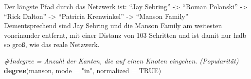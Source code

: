 \documentclass[
]{article}
\newenvironment{Shaded}{\begin{snugshade}}{\end{snugshade}}
\newcommand{\CommentTok}[1]{\textcolor[rgb]{0.56,0.35,0.01}{\textit{#1}}}
\newcommand{\DataTypeTok}[1]{\textcolor[rgb]{0.13,0.29,0.53}{#1}}
\newcommand{\KeywordTok}[1]{\textcolor[rgb]{0.13,0.29,0.53}{\textbf{#1}}}
\newcommand{\NormalTok}[1]{#1}
\newcommand{\OtherTok}[1]{\textcolor[rgb]{0.56,0.35,0.01}{#1}}
\newcommand{\StringTok}[1]{\textcolor[rgb]{0.31,0.60,0.02}{#1}}
\begin{document}
Der längste Pfad durch das Netzwerk ist: ``Jay Sebring'' -\textgreater{}
``Roman Polanski'' -\textgreater{} ``Rick Dalton'' -\textgreater{}
``Patricia Krenwinkel'' -\textgreater{} ``Manson Family''\\
Dementsprechend sind Jay Sebring und die Manson Family am weitesten
voneinander entfernt, mit einer Distanz von 103 Schritten und ist damit
nur halb so groß, wie das reale Netzwerk.

\begin{Shaded}
\begin{Highlighting}[]
\CommentTok{#Indegree = Anzahl der Kanten, die auf einen Knoten eingehen. (Popularität)}
\KeywordTok{degree}\NormalTok{(manson, }\DataTypeTok{mode =} \StringTok{"in"}\NormalTok{, }\DataTypeTok{normalized =} \OtherTok{TRUE}\NormalTok{)}
\end{Highlighting}
\end{Shaded}
\end{document}

